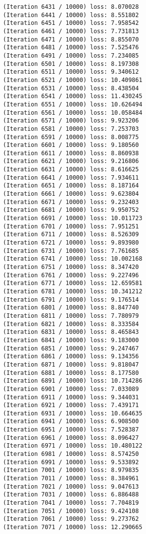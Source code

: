 \documentclass[11pt]{article}
\begin{document}
\begin{Verbatim}[commandchars=\\\{\}]
(Iteration 6431 / 10000) loss: 8.070028
(Iteration 6441 / 10000) loss: 8.551802
(Iteration 6451 / 10000) loss: 7.958542
(Iteration 6461 / 10000) loss: 7.731813
(Iteration 6471 / 10000) loss: 8.855070
(Iteration 6481 / 10000) loss: 7.525476
(Iteration 6491 / 10000) loss: 7.234085
(Iteration 6501 / 10000) loss: 8.197308
(Iteration 6511 / 10000) loss: 9.340612
(Iteration 6521 / 10000) loss: 10.409861
(Iteration 6531 / 10000) loss: 8.438504
(Iteration 6541 / 10000) loss: 11.430245
(Iteration 6551 / 10000) loss: 10.626494
(Iteration 6561 / 10000) loss: 10.058484
(Iteration 6571 / 10000) loss: 9.923206
(Iteration 6581 / 10000) loss: 7.253703
(Iteration 6591 / 10000) loss: 8.008775
(Iteration 6601 / 10000) loss: 9.180560
(Iteration 6611 / 10000) loss: 8.860938
(Iteration 6621 / 10000) loss: 9.216806
(Iteration 6631 / 10000) loss: 8.616625
(Iteration 6641 / 10000) loss: 7.934611
(Iteration 6651 / 10000) loss: 8.187164
(Iteration 6661 / 10000) loss: 9.623804
(Iteration 6671 / 10000) loss: 9.232403
(Iteration 6681 / 10000) loss: 9.950752
(Iteration 6691 / 10000) loss: 10.011723
(Iteration 6701 / 10000) loss: 7.951251
(Iteration 6711 / 10000) loss: 8.526309
(Iteration 6721 / 10000) loss: 9.893980
(Iteration 6731 / 10000) loss: 7.761685
(Iteration 6741 / 10000) loss: 10.002168
(Iteration 6751 / 10000) loss: 8.347420
(Iteration 6761 / 10000) loss: 9.227496
(Iteration 6771 / 10000) loss: 12.659581
(Iteration 6781 / 10000) loss: 10.341212
(Iteration 6791 / 10000) loss: 9.176514
(Iteration 6801 / 10000) loss: 8.847740
(Iteration 6811 / 10000) loss: 7.780979
(Iteration 6821 / 10000) loss: 8.333584
(Iteration 6831 / 10000) loss: 8.465843
(Iteration 6841 / 10000) loss: 9.183000
(Iteration 6851 / 10000) loss: 9.247467
(Iteration 6861 / 10000) loss: 9.134356
(Iteration 6871 / 10000) loss: 9.818047
(Iteration 6881 / 10000) loss: 8.177580
(Iteration 6891 / 10000) loss: 10.714286
(Iteration 6901 / 10000) loss: 7.033089
(Iteration 6911 / 10000) loss: 9.344031
(Iteration 6921 / 10000) loss: 7.439171
(Iteration 6931 / 10000) loss: 10.664635
(Iteration 6941 / 10000) loss: 6.908500
(Iteration 6951 / 10000) loss: 7.528387
(Iteration 6961 / 10000) loss: 8.096427
(Iteration 6971 / 10000) loss: 10.480122
(Iteration 6981 / 10000) loss: 8.574250
(Iteration 6991 / 10000) loss: 9.533892
(Iteration 7001 / 10000) loss: 8.979835
(Iteration 7011 / 10000) loss: 8.384961
(Iteration 7021 / 10000) loss: 9.047613
(Iteration 7031 / 10000) loss: 6.886488
(Iteration 7041 / 10000) loss: 7.704819
(Iteration 7051 / 10000) loss: 9.424108
(Iteration 7061 / 10000) loss: 9.273762
(Iteration 7071 / 10000) loss: 12.290665

\end{Verbatim}
\end{document}

